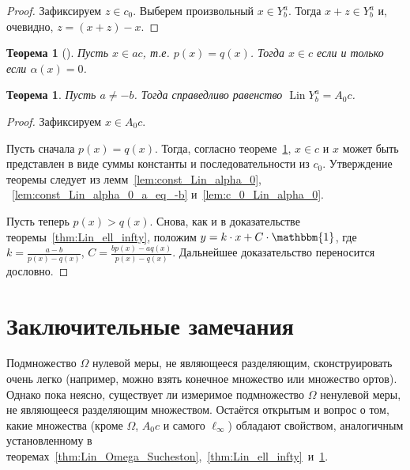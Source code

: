 \documentclass[a4paper,14pt]{article} %
\theoremstyle{plain}
\newtheorem{theorem}[lemma]{Теорема}
\begin{document}
\begin{proof}
	Зафиксируем $z\in c_0$.
	Выберем произвольный $x \in Y^a_b$.
	Тогда $x+z\in Y^a_b$ и, очевидно, $z=(x+z)-x$.
\end{proof}

\begin{theorem}[{\cite[следствие 2]{our-mz2019ac0}}]
	\label{thm:alpha_c_ac_c}
	Пусть $x\in ac$, т.е. $p(x) = q(x)$.
	Тогда $x\in c$ если и только если $\alpha(x) = 0$.
\end{theorem}

\begin{theorem}
	\label{thm:A_0_c_infty_lin}
	Пусть $a\neq -b$.
	Тогда справедливо равенство $\operatorname{Lin} Y^a_b = A_0 c$.
\end{theorem}

\begin{proof}
	Зафиксируем $x \in A_0 c$.

	Пусть сначала $p(x) = q(x)$.
	Тогда, согласно теореме~\ref{thm:alpha_c_ac_c}, $x\in c$
	и $x$ может быть представлен в виде суммы константы и последовательности из $c_0$.
	Утверждение теоремы следует из лемм~\ref{lem:const_Lin_alpha_0}, ~\ref{lem:const_Lin_alpha_0_a_eq_-b} и~\ref{lem:c_0_Lin_alpha_0}.

	Пусть теперь $p(x) > q(x)$.
	Снова, как и в доказательстве теоремы~\ref{thm:Lin_ell_infty},
	положим $y=k\cdot x + C\cdot\mathbbm{1}$,
	где $k=\frac{a-b}{p(x)-q(x)}$, $C=\frac{bp(x)-aq(x)}{p(x)-q(x)}$.
	Дальнейшее доказательство переносится дословно.
\end{proof}


\section{Заключительные замечания}
Подмножество $\Omega$ нулевой меры, не являющееся разделяющим, сконструировать очень легко
(например, можно взять конечное множество или множество ортов).
Однако пока неясно, существует ли измеримое подмножество $\Omega$ ненулевой меры,
не являющееся разделяющим множеством.
Остаётся открытым и вопрос о том, какие множества (кроме $\Omega$, $A_0 c$ и самого $\ell_\infty$)
обладают свойством, аналогичным установленному в теоремах~\ref{thm:Lin_Omega_Sucheston},~\ref{thm:Lin_ell_infty}~и~\ref{thm:A_0_c_infty_lin}.


\printbibliography
\end{document}
